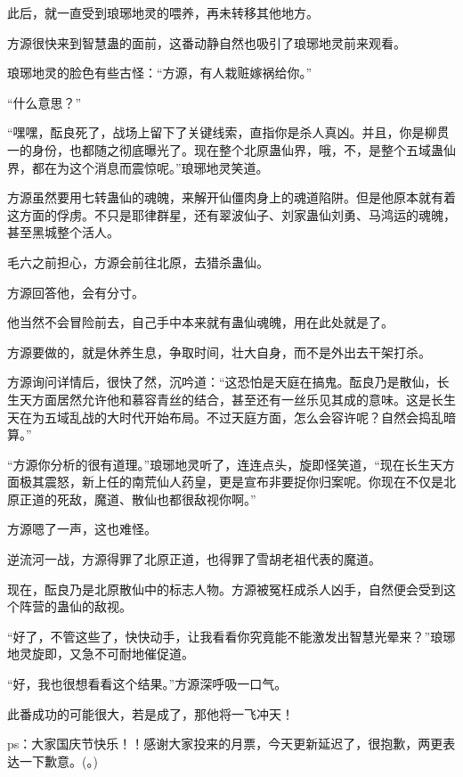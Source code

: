 \begin{this_body}
此后，就一直受到琅琊地灵的喂养，再未转移其他地方。

方源很快来到智慧蛊的面前，这番动静自然也吸引了琅琊地灵前来观看。

琅琊地灵的脸色有些古怪：“方源，有人栽赃嫁祸给你。”

“什么意思？”

“嘿嘿，酝良死了，战场上留下了关键线索，直指你是杀人真凶。并且，你是柳贯一的身份，也都随之彻底曝光了。现在整个北原蛊仙界，哦，不，是整个五域蛊仙界，都在为这个消息而震惊呢。”琅琊地灵笑道。

方源虽然要用七转蛊仙的魂魄，来解开仙僵肉身上的魂道陷阱。但是他原本就有着这方面的俘虏。不只是耶律群星，还有翠波仙子、刘家蛊仙刘勇、马鸿运的魂魄，甚至黑城整个活人。

毛六之前担心，方源会前往北原，去猎杀蛊仙。

方源回答他，会有分寸。

他当然不会冒险前去，自己手中本来就有蛊仙魂魄，用在此处就是了。

方源要做的，就是休养生息，争取时间，壮大自身，而不是外出去干架打杀。

方源询问详情后，很快了然，沉吟道：“这恐怕是天庭在搞鬼。酝良乃是散仙，长生天方面居然允许他和慕容青丝的结合，甚至还有一丝乐见其成的意味。这是长生天在为五域乱战的大时代开始布局。不过天庭方面，怎么会容许呢？自然会捣乱暗算。”

“方源你分析的很有道理。”琅琊地灵听了，连连点头，旋即怪笑道，“现在长生天方面极其震怒，新上任的南荒仙人药皇，更是宣布非要捉你归案呢。你现在不仅是北原正道的死敌，魔道、散仙也都很敌视你啊。”

方源嗯了一声，这也难怪。

逆流河一战，方源得罪了北原正道，也得罪了雪胡老祖代表的魔道。

现在，酝良乃是北原散仙中的标志人物。方源被冤枉成杀人凶手，自然便会受到这个阵营的蛊仙的敌视。

“好了，不管这些了，快快动手，让我看看你究竟能不能激发出智慧光晕来？”琅琊地灵旋即，又急不可耐地催促道。

“好，我也很想看看这个结果。”方源深呼吸一口气。

此番成功的可能很大，若是成了，那他将一飞冲天！

ps：大家国庆节快乐！！感谢大家投来的月票，今天更新延迟了，很抱歉，两更表达一下歉意。(。)

\end{this_body}

